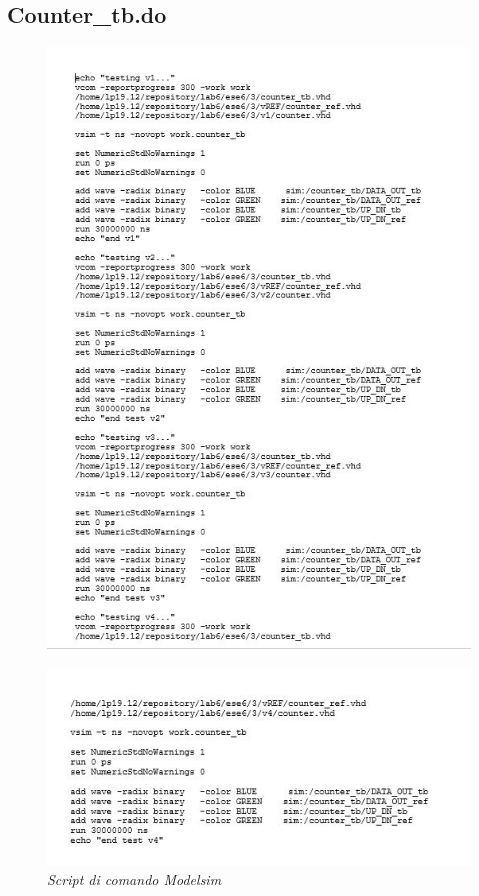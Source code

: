 \subsection{Counter\_tb.do}
\begin{figure}[!htb]
	\centering
	\includegraphics[scale=1]{immagini/counterdo1}
	\label{counterdo1}
\end{figure}
\begin{figure}[!htb]
	\centering
	\includegraphics[scale=1]{immagini/counterdo2}
	\caption{\textit{Script di comando Modelsim}}
	\label{counterdo2}
\end{figure}
\newpage
